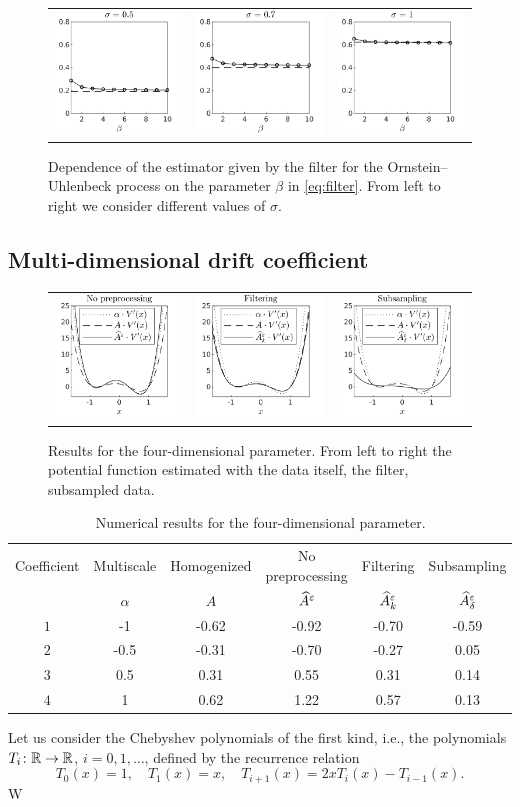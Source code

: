 \documentclass[10pt]{article}
\begin{document}
\begin{figure}[t]
	\centering
	\begin{tabular}{ccc}
		\includegraphics[]{Figures/OUBeta_s5} & \includegraphics[]{Figures/OUBeta_s7}  & \includegraphics[]{Figures/OUBeta_s10} \\
	\end{tabular}
	\caption{Dependence of the estimator given by the filter for the Ornstein--Uhlenbeck process on the parameter $\beta$ in \eqref{eq:filter}. From left to right we consider different values of $\sigma$.}
	\label{fig:OUBeta}
\end{figure}

\subsection{Multi-dimensional drift coefficient}

\begin{figure}[t]
	\centering
	\begin{tabular}{ccc}
		\includegraphics[]{Figures/KLNothing} & \includegraphics[]{Figures/KLFilt}  & \includegraphics[]{Figures/KLSubs}
	\end{tabular}
	\caption{Results for the four-dimensional parameter. From left to right the potential function estimated with the data itself, the filter, subsampled data.}
	\label{fig:KLStyle}
\end{figure}

\begin{table}[t]
	\centering
	\begin{tabular}{cccccc}
		\toprule
		Coefficient & Multiscale & Homogenized & No preprocessing  & Filtering  		  & Subsampling  			 \\ 
		& $\alpha$ & $A$   & $\widehat A^\varepsilon$ & $\widehat A^\varepsilon_k$ & $\widehat A^\varepsilon_\delta$ \\
		\midrule
		$1$ &-1   & -0.62 & -0.92 & -0.70 & -0.59\\
		$2$ &-0.5 & -0.31 & -0.70 & -0.27 & 0.05 \\
		$3$ & 0.5 & 0.31  & 0.55  & 0.31  & 0.14 \\
		$4$ & 1   & 0.62  & 1.22  & 0.57  & 0.13 \\
		\bottomrule
	\end{tabular}
	\caption{Numerical results for the four-dimensional parameter.}
	\label{tab:KLStyle}
\end{table}

Let us consider the Chebyshev polynomials of the first kind, i.e., the polynomials $T_i\colon \mathbb{R} \to \mathbb{R}$, $i=0, 1, \ldots$, defined by the recurrence relation
\begin{equation}
T_0(x) = 1, \quad T_1(x) = x, \quad T_{i+1}(x) = 2xT_i(x) - T_{i-1}(x).
\end{equation}
W
\end{document}
